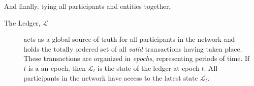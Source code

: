 And finally, tying all participants and entities together,

\begin{description}
    \item[The Ledger, $\mathcal{L}$] acts as a global source of truth for all
        participants in the network and holds the totally ordered set of all
        \emph{valid} transactions having taken place. These transactions are
        organized in \emph{epochs}, representing periods of time. If $t$ is a
        an epoch, then $\mathcal{L}_t$ is the state of the ledger at epoch $t$.
        All participants in the network have access to the latest state
        $\mathcal{L}_t$.
\end{description}

